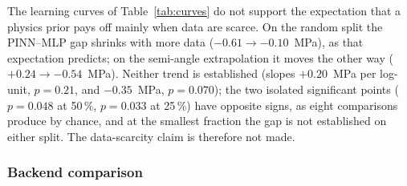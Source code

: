 \documentclass[subscriptcorrection,upint,varvw,barcolor=Goldenrod3,mathalfa=cal=euler,balance,hyphenate,french,pdf-a]{asmejour} %
\begin{document}
The learning curves of Table~\ref{tab:curves} do not support the expectation that a physics prior pays off mainly when data are scarce. On the random split the PINN--MLP gap shrinks with more data ($-0.61\to-0.10$~MPa), as that expectation predicts; on the semi-angle extrapolation it moves the other way ($+0.24\to-0.54$~MPa). Neither trend is established (slopes $+0.20$~MPa per log-unit, $p=0.21$, and $-0.35$~MPa, $p=0.070$); the two isolated significant points ($p=0.048$ at 50\,\%, $p=0.033$ at 25\,\%) have opposite signs, as eight comparisons produce by chance, and at the smallest fraction the gap is not established on either split. The data-scarcity claim is therefore not made.

\subsubsection{Backend comparison}
\label{sec:res_backend}
\end{document}
